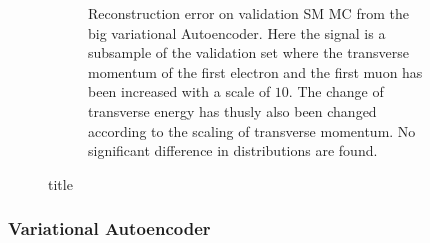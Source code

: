 \begin{figure}[h!]
\begin{subfigure}{.45\textwidth}
        \caption{Reconstruction error on validation SM MC from the big variational Autoencoder. Here the signal is a subsample of the validation 
        set where the transverse momentum of the first electron and the first muon has been increased with a scale of $10$. The change of transverse 
        energy has thusly also been changed according to the scaling of transverse momentum. No significant difference in distributions are found. }
        \label{fig:ae_big_pt_10}
    \end{subfigure}
    \hfill 
    \caption{title}
    \label{fig:ae_big_small_pt_10}
\end{figure}



\subsubsection*{Variational Autoencoder}

